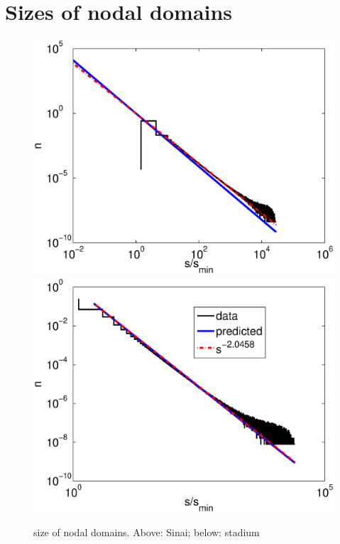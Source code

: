 \documentclass{report}
\begin{document}
\section{Sizes of nodal domains}
\begin{figure}
  \begin{center}
    \includegraphics[width=\textwidth]{figs/results/qugrs_1000_to_1200_sizes.eps}
    \includegraphics[width=\textwidth]{figs/results/qust_700_to_900_sizes_0.1_sampled.eps}
    \caption{size of nodal domains. Above: Sinai; below: stadium}
    \label{fig:size}
  \end{center}
\end{figure}
\end{document}
